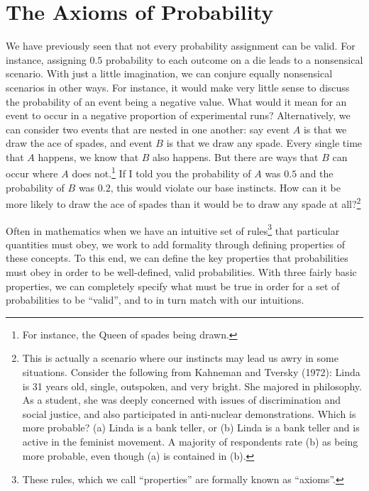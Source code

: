 \documentclass[
  letterpaper,
  DIV=11,
  numbers=noendperiod]{scrreprt}
\theoremstyle{definition}
\theoremstyle{definition}
\theoremstyle{definition}
\theoremstyle{remark}
\begin{document}
\section{The Axioms of Probability}\label{the-axioms-of-probability}

We have previously seen that not every probability assignment can be
valid. For instance, assigning \(0.5\) probability to each outcome on a
die leads to a nonsensical scenario. With just a little imagination, we
can conjure equally nonsensical scenarios in other ways. For instance,
it would make very little sense to discuss the probability of an event
being a negative value. What would it mean for an event to occur in a
negative proportion of experimental runs? Alternatively, we can consider
two events that are nested in one another: say event \(A\) is that we
draw the ace of spades, and event \(B\) is that we draw any spade. Every
single time that \(A\) happens, we know that \(B\) also happens. But
there are ways that \(B\) can occur where \(A\) does not.\footnote{For
  instance, the Queen of spades being drawn.} If I told you the
probability of \(A\) was \(0.5\) and the probability of \(B\) was
\(0.2\), this would violate our base instincts. How can it be more
likely to draw the ace of spades than it would be to draw any spade at
all?\footnote{This is actually a scenario where our instincts may lead
  us awry in some situations. Consider the following from Kahneman and
  Tversky (1972): {Linda is 31 years old, single, outspoken, and very
  bright. She majored in philosophy. As a student, she was deeply
  concerned with issues of discrimination and social justice, and also
  participated in anti-nuclear demonstrations. Which is more probable?
  (a) Linda is a bank teller, or (b) Linda is a bank teller and is
  active in the feminist movement.} A majority of respondents rate (b)
  as being more probable, even though (a) is contained in (b).}

Often in mathematics when we have an intuitive set of rules\footnote{These
  rules, which we call ``properties'' are formally known as ``axioms''.}
that particular quantities must obey, we work to add formality through
defining properties of these concepts. To this end, we can define the
key properties that probabilities must obey in order to be well-defined,
valid probabilities. With three fairly basic properties, we can
completely specify what must be true in order for a set of probabilities
to be ``valid'', and to in turn match with our intuitions.
\end{document}
